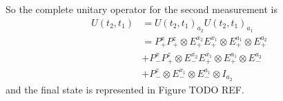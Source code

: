 So the complete unitary operator for the second measurement is
\begin{align}
  U(t_2, t_1) &= U(t_2, t_1)_{a_2} U(t_2, t_1)_{a_1} \\ \nonumber
  &= P^x_+ P^z_+ \otimes E^{x_2}_+  E^{x_1}_+ \otimes E^{a_1}_+ \otimes E^{a_2}_+ \\ \nonumber
  &+ P^x_- P^z_+ \otimes E^{x_2}_-  E^{x_1}_+ \otimes E^{a_1}_+ \otimes E^{a_2}_- \\ \nonumber
  &+ P^z_- \otimes E^{x_1}_- \otimes E^{a_1}_- \otimes I_{a_2}
\end{align}
and the final state is represented in Figure TODO REF.

